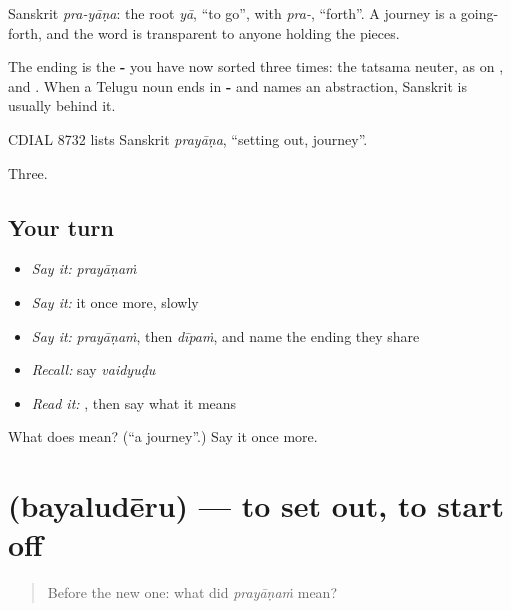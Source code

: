 Sanskrit \emph{pra-yāṇa}: the root \emph{yā}, \textquotedblleft{}to go\textquotedblright{}, with \emph{pra-}, \textquotedblleft{}forth\textquotedblright{}. A journey is a going-forth, and the word is transparent to anyone holding the pieces.

The ending is the \textbf{-} you have now sorted three times: the tatsama neuter, as on ,  and . When a Telugu noun ends in \textbf{-} and names an abstraction, Sanskrit is usually behind it.

CDIAL 8732 lists Sanskrit \emph{prayāṇa}, \textquotedblleft{}setting out, journey\textquotedblright{}.

\begin{grammarlens}[title={What you've built}]
Three.
\end{grammarlens}

\subsection*{Your turn}
\begin{itemize}
\raggedright
  \item \emph{Say it:} \emph{prayāṇaṁ}
  \item \emph{Say it:} it once more, slowly
  \item \emph{Say it:} \emph{prayāṇaṁ}, then \emph{dīpaṁ}, and name the ending they share
  \item \emph{Recall:} say \emph{vaidyuḍu}
  \item \emph{Read it:} \textbf{}, then say what it means
\end{itemize}

\begin{tcolorbox}[breakable,colback=teal!4,colframe=teal!35!black,title={Before you move on}]
What does  mean? (\textquotedblleft{}a journey\textquotedblright{}.) Say it once more.
\end{tcolorbox}
\section[\texorpdfstring{\te{బయలుదేరు} (bayaludēru)}{బయలుదేరు (bayaludēru)}]{ (bayaludēru) — to set out, to start off}

\label{lesson:TE-C50-set-out}



\begin{quote}
Before the new one: what did \emph{prayāṇaṁ} mean?
\end{quote}

